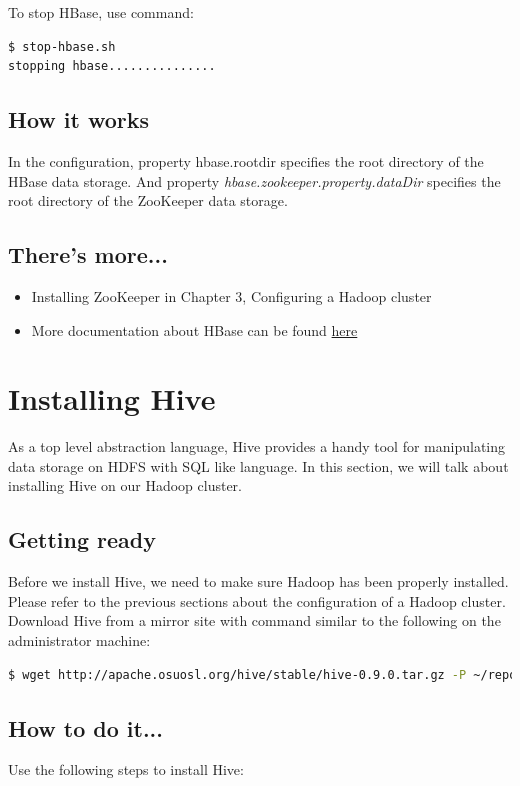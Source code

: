 To stop HBase, use command:
\begin{verbatim}
$ stop-hbase.sh
stopping hbase...............
\end{verbatim}

\subsection*{How it works}
In the configuration, property hbase.rootdir specifies the root directory of the HBase data storage. And property \emph{hbase.zookeeper.property.dataDir} specifies the root directory of the ZooKeeper data storage.

\subsection*{There's more...}
\begin{itemize}
  \item Installing ZooKeeper in Chapter 3, Configuring a Hadoop cluster
  \item More documentation about HBase can be found \href{http://wiki.apache.org/hadoop/Hbase}{here}
\end{itemize}

\section{Installing Hive}
As a top level abstraction language, Hive provides a handy tool for manipulating data storage on HDFS with SQL like language. In this section, we will talk about installing Hive on our Hadoop cluster.

\subsection*{Getting ready}
Before we install Hive, we need to make sure Hadoop has been properly installed. Please refer to the previous sections about the configuration of a Hadoop cluster. \\
Download Hive from a mirror site with command similar to the following on the administrator machine:
\lstset{style=bashstyle}
\begin{lstlisting}[language=bash]
$ wget http://apache.osuosl.org/hive/stable/hive-0.9.0.tar.gz -P ~/repo
\end{lstlisting}

\subsection*{How to do it...}
Use the following steps to install Hive:


